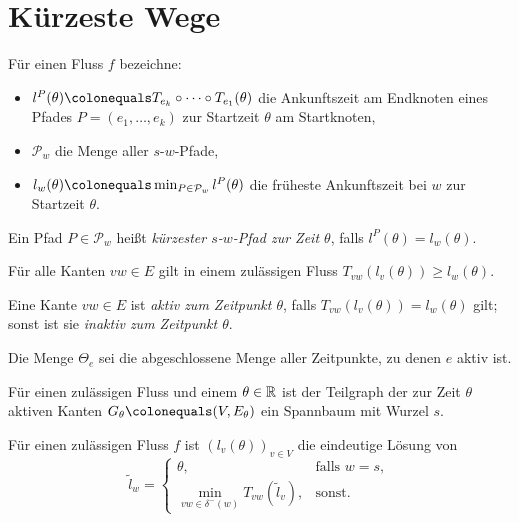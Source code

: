 \section{Kürzeste Wege}

\begin{frame}
	\begin{definition}
		Für einen Fluss $f$ bezeichne:
		\begin{itemize}[label=\color{darkblue}$\bullet$]
			\item\pause $l^P(\theta)\colonequals T_{e_k}\circ\dots\circ T_{e_1}(\theta)$ die Ankunftszeit am Endknoten eines Pfades $P=(e_1,\dots,e_k)$ zur Startzeit $\theta$ am Startknoten,
			\item\pause $\mathcal{P}_w$ die Menge aller $s$-$w$-Pfade,
			\item\pause $l_w(\theta) \colonequals \min_{P\in\mathcal{P}_w} l^P(\theta)$ die früheste Ankunftszeit bei $w$ zur Startzeit $\theta$.
		\end{itemize}
	\pause Ein Pfad $P\in \mathcal{P}_w$ heißt \emph{kürzester $s$-$w$-Pfad zur Zeit $\theta$}, falls $l^P(\theta)=l_w(\theta)$.
	\end{definition}
	\pause\begin{lemma}[Dreiecksungleichung]
		Für alle Kanten $vw\in E$ gilt in einem zulässigen Fluss $T_{vw}(l_v(\theta))\geq l_w(\theta)$.
	\end{lemma}
\end{frame}

\begin{frame}
	\begin{definition}
		Eine Kante $vw\in E$ ist \emph{aktiv zum Zeitpunkt $\theta$}, falls $T_{vw}(l_v(\theta)) = l_w(\theta)$ gilt; sonst ist sie \emph{inaktiv zum Zeitpunkt $\theta$}.
		
		Die Menge $\Theta_e$ sei die abgeschlossene Menge aller Zeitpunkte, zu denen $e$ aktiv ist.
	\end{definition}
	\pause\begin{lemma}
		Für einen zulässigen Fluss und einem $\theta\in\mathbb{R}$ ist der Teilgraph der zur Zeit $\theta$ aktiven Kanten $G_\theta\colonequals(V, E_\theta)$ ein Spannbaum mit Wurzel $s$.
	\end{lemma}
	\pause\begin{proposition}
			Für einen zulässigen Fluss $f$ ist $(l_v(\theta))_{v\in V}$ die eindeutige Lösung von
		\[ \tilde{l}_w = \begin{cases}
		\theta, & \text{falls } w=s, \\
		\min\limits_{vw\in \delta^-(w)} T_{vw}(\tilde{l}_v), & \text{sonst}.
		\end{cases} \]
	\end{proposition}
\end{frame}